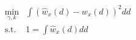 \begin{equation}
\begin{split}
	\min_{\gamma, k}& \int \left(\hat{w}_{x}(d) - w_{x}(d)\right)^2 dd\\
	\text{s.t.}& 1 = \int \hat{w}_{x}(d) dd
\end{split}
\label{ch4:equ:trip-distance-minimisation}
\end{equation}